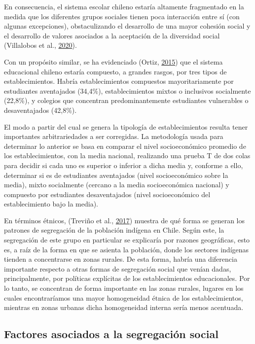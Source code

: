 \documentclass[
]{article}
\begin{document}
En consecuencia, el sistema escolar chileno estaría altamente
fragmentado en la medida que los diferentes grupos sociales tienen poca
interacción entre sí (con algunas excepciones), obstaculizando el
desarrollo de una mayor cohesión social y el desarrollo de valores
asociados a la aceptación de la diversidad social (Villalobos et al.,
\protect\hyperlink{ref-villalobos_composicion_2020}{2020}).

Con un propósito similar, se ha evidenciado (Ortiz,
\protect\hyperlink{ref-ortiz_escuelas_2015}{2015}) que el sistema
educacional chileno estaría compuesto, a grandes rasgos, por tres tipos
de establecimientos. Habría establecimientos compuestos mayoritariamente
por estudiantes aventajados (34,4\%), establecimientos mixtos o
inclusivos socialmente (22,8\%), y colegios que concentran
predominantemente estudiantes vulnerables o desaventajados (42,8\%).

El modo a partir del cual se genera la tipología de establecimientos
resulta tener importantes arbitrariedades a ser corregidas. La
metodología usada para determinar lo anterior se basa en comparar el
nivel socioeconómico promedio de los establecimientos, con la media
nacional, realizando una prueba T de dos colas para decidir si cada uno
es superior o inferior a dicha media y, conforme a ello, determinar si
es de estudiantes aventajados (nivel socioeconómico sobre la media),
mixto socialmente (cercano a la media socioeconómica nacional) y
compuesto por estudiantes desaventajados (nivel socioeconómico del
establecimiento bajo la media).

En términos étnicos, (Treviño et al.,
\protect\hyperlink{ref-trevino_educacion_2017}{2017}) muestra de qué
forma se generan los patrones de segregación de la población indígena en
Chile. Según este, la segregación de este grupo en particular se
explicaría por razones geográficas, esto es, a raíz de la forma en que
se asienta la población, donde los sectores indígenas tienden a
concentrarse en zonas rurales. De esta forma, habría una diferencia
importante respecto a otras formas de segregación social que venían
dadas, principalmente, por políticas explícitas de los establecimientos
educacionales. Por lo tanto, se concentran de forma importante en las
zonas rurales, lugares en los cuales encontraríamos una mayor
homogeneidad étnica de los establecimientos, mientras en zonas urbanas
dicha homogeneidad interna sería menos acentuada.

\hypertarget{factores-asociados-a-la-segregaciuxf3n-social}{%
\subsection{Factores asociados a la segregación
social}\label{factores-asociados-a-la-segregaciuxf3n-social}}
\end{document}
